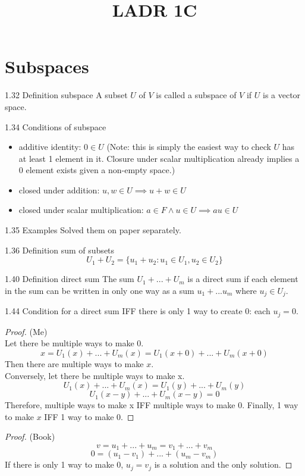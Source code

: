 \documentclass[12pt, letterpaper]{article}
\title{LADR 1C}
\begin{document}
\maketitle

\section*{Subspaces}

\begin{imp}{1.32 Definition subspace}
A subset $U$ of $V$ is called a subspace of $V$ if $U$ is a vector space.
\end{imp}

\begin{imp}{1.34 Conditions of subspace}
\begin{itemize}
    \item additive identity: 
    $0\in U$ (Note: this is simply the easiest way to check $U$ has at least 1 element in it.
    Closure under scalar multiplication already implies a 0 element exists given a non-empty space.)
    \item closed under addition: 
    $u,w\in U \implies u+w\in U$
    \item closed under scalar multiplication:
    $a\in F\land u\in U \implies au\in U$
\end{itemize}
\end{imp}

\begin{imp}{1.35 Examples}
Solved them on paper separately.
\end{imp}

\begin{imp}{1.36 Definition sum of subsets}
$$U_1+U_2=\{u_1+u_2:u_1\in U_1,u_2\in U_2\}$$
\end{imp}

\begin{imp}{1.40 Definition direct sum}
The sum $U_1 + ... + U_m$ is a direct sum if each element in 
the sum can be written in only one way as a sum 
$u_1 + ... u_m$ where $u_j \in U_j$.
\end{imp}

\begin{imp}{1.44 Condition for a direct sum}
IFF there is only 1 way to create 0: each $u_j = 0$.
\begin{proof} (Me)
\\Let there be multiple ways to make 0.
$$x=U_1(x) + ... + U_m(x)=U_1(x+0) + ... + U_m(x+0)$$
Then there are multiple ways to make $x$.
\\Conversely, let there be multiple ways to make x.
$$U_1(x)+...+U_m(x)=U_1(y)+...+U_m(y)$$
$$U_1(x-y)+...+U_m(x-y)=0$$
Therefore, multiple ways to make x IFF multiple ways to make 0.
Finally, 1 way to make $x$ IFF 1 way to make 0.
\end{proof}
\begin{proof} (Book)
$$v = u_1 + ... + u_m = v_1 + ... + v_m$$
$$0 = (u_1 - v_1) + ... + (u_m - v_m)$$
If there is only 1 way to make 0, $u_j = v_j$ is a solution and the only solution.
\end{proof}
\end{imp}
\end{document}
